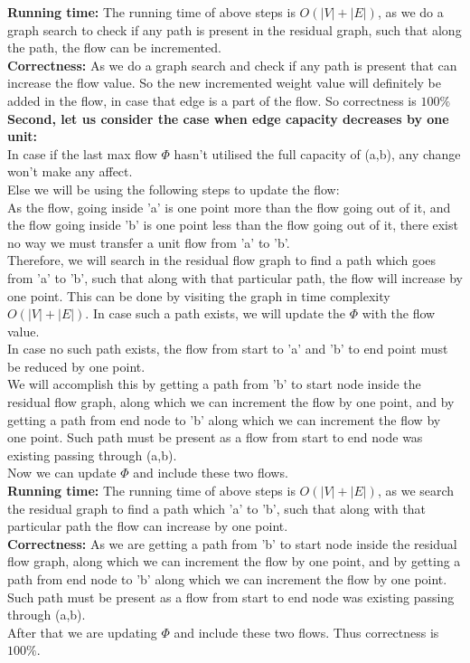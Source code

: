 \documentclass[11pt]{article}
\newcommand\correctness{\vspace{.10in}\textbf{Correctness: }}
\newcommand\runtime{\vspace{.10in}\textbf{Running time: }}
\begin{document}
\runtime The running time of above steps is $O(|V|+|E|)$, as we do a graph search to check if any path is present in the residual graph, such that along the path, the flow can be incremented.\\[10pt]

\correctness As we do a graph search and check if any path is present that can increase the flow value. So the new incremented weight value will definitely be added in the flow, in case that edge is a part of the flow. So correctness is $100\%$ \\[15pt]
{\bf Second, let us consider the case when edge capacity decreases by one unit:}\\
In case if the last max flow $\Phi$ hasn't utilised the full capacity of (a,b), any change won't make any affect.\\
Else we will be using the following steps to update the flow:\\
As the flow, going inside 'a' is one point more than the flow going out of it, and the flow going inside 'b' is one point less than the flow going out of it, there exist no way we must transfer a unit flow from 'a' to 'b'.\\
Therefore, we will search in the residual flow graph to find a path which goes from 'a' to 'b', such that along with that particular path, the flow will increase by one point. This can be done by visiting the graph in time complexity $O(|V|+|E|)$. In case such a path exists, we will update the $\Phi$ with the flow value.\\
In case no such path exists, the flow from start to 'a' and 'b' to end point must be reduced by one point.\\
We will accomplish this by getting a path from 'b' to start node inside the residual flow graph, along which we can increment the flow by one point, and by getting a path from end node to 'b' along which we can increment the flow by one point. Such path must be present as a flow from start to end node was existing passing through (a,b). \\
Now we can update $\Phi$ and include these two flows.\\[10pt]

\runtime The running time of above steps is $O(|V|+|E|)$, as we search the residual graph to find a path which 'a' to 'b', such that along with that particular path the flow can increase by one point.\\ [10pt]

\correctness As we are getting a path from 'b' to start node inside the residual flow graph, along which we can increment the flow by one point, and by getting a path from end node to 'b' along which we can increment the flow by one point. Such path must be present as a flow from start to end node was existing passing through (a,b). \\
After that we are updating $\Phi$ and include these two flows. Thus correctness is $100\%$.
\end{document}
